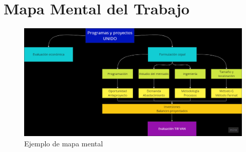 \documentclass[class=article, crop=false]{standalone}
\begin{document}
\section{Mapa Mental del Trabajo}

\begin{figure}[h]
    \centering
    \includegraphics[width=.9\textwidth]{images/mapa_mental.png}
    \caption{Ejemplo de mapa mental}
    \label{fig:enter-label}
\end{figure}
\end{document}
